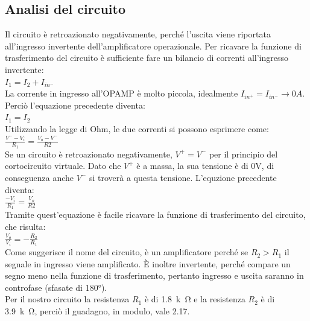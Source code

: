 \documentclass{report}
\begin{document}
\subsection{Analisi del circuito} 
Il circuito è retroazionato negativamente, perché l'uscita viene riportata all'ingresso invertente dell'amplificatore operazionale. Per ricavare la funzione di trasferimento del circuito è sufficiente fare un bilancio di correnti all'ingresso invertente:
\\[2pt]\indent $I_1=I_2+I_{in^-}$
\\[2pt]La corrente in ingresso all'OPAMP è molto piccola, idealmente $I_{in^+}=I_{in^-}\rightarrow 0A$. Perciò l'equazione precedente diventa:
\\\indent $\displaystyle{I_1=I_2}$
\\Utilizzando la legge di Ohm, le due correnti si possono esprimere come:
\\[2pt]\indent $\displaystyle{\frac{V^--V_i}{R_1}=\frac{V_o-V^-}{R2}}$
\\[2pt]Se un circuito è retroazionato negativamente, $V^+=V^-$ per il principio del cortocircuito virtuale. Dato che $V^+$ è a massa, la sua tensione è di 0V, di conseguenza anche $V^-$ si troverà a questa tensione. L'equzione precedente diventa:
\\[2pt]\indent $\displaystyle{\frac{-V_i}{R_1}=\frac{V_o}{R2}}$
\\[2pt]Tramite quest'equazione è facile ricavare la funzione di trasferimento del circuito, che risulta:
\\[2pt]\indent $\displaystyle{\frac{V_o}{V_i}=-\frac{R_2}{R_1}}$
\\[2pt]Come suggerisce il nome del circuito, è un amplificatore perché se $R_2>R_1$ il segnale in ingresso viene amplificato. È inoltre invertente, perché compare un segno meno nella funzione di trasferimento, pertanto ingresso e uscita saranno in controfase (sfasate di 180°).
\\Per il nostro circuito la resistenza $R_1$ è di \SI{1.8}{k\ohm} e la resistenza $R_2$ è di \SI{3.9}{k\ohm}, perciò il guadagno, in modulo, vale 2.17.
\end{document}
